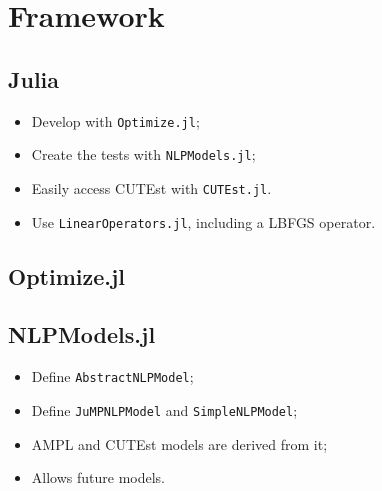 \section{Framework}

\subsection{Julia}


\begin{frame}[fragile]
  \begin{itemize}
    \item Develop with \texttt{Optimize.jl};
    \item Create the tests with \texttt{NLPModels.jl};
    \item Easily access CUTEst with \texttt{CUTEst.jl}.
    \item Use \texttt{LinearOperators.jl}, including a LBFGS
      operator.
  \end{itemize}
\end{frame}

\subsection{Optimize.jl}


\subsection{NLPModels.jl}

\begin{frame}[fragile]
  \begin{itemize}
    \item Define \texttt{AbstractNLPModel};
    \item Define \texttt{JuMPNLPModel} and
      \texttt{SimpleNLPModel};
    \item AMPL and CUTEst models are derived from it;
    \item Allows future models.
  \end{itemize}
\end{frame}

